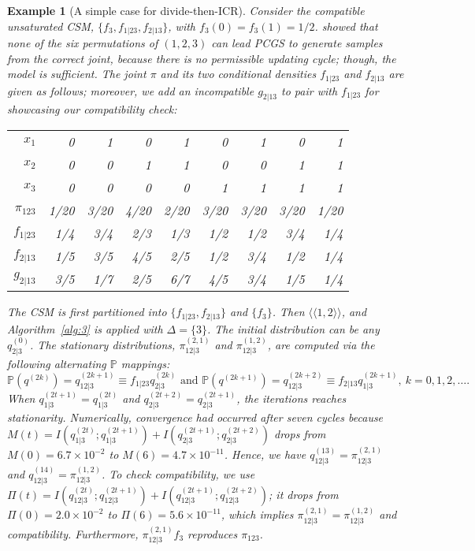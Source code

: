 \documentclass[12pt,a4paper]{article}
\newtheorem{example}{Example}
\begin{document}
\begin{example}[A simple case for divide-then-ICR]\label{ex:1}\rm
Consider the compatible unsaturated CSM, $\{f_3, f_{1|23}, f_{2|13}\}$, with $f_3(0)=f_3(1)=1/2$. \citet{Kuo2018} showed that none of the  six permutations of $(1,2,3)$ can lead PCGS to  generate samples from the correct joint,  because
there is no permissible updating cycle; though, the model is sufficient.
The joint $\pi$ and its two conditional densities $f_{1|23}$ and $f_{2|13}$ are given as follows; moreover, we add an incompatible $g_{2|13}$ to pair with $f_{1|23}$ for showcasing our compatibility check:
\begin{center}
\begin{tabular}{rrrrrrrrr}
\toprule
$x_1$&0&1&0&1&0&1&0&1\\
$x_2$&0&0&1&1&0&0&1&1\\
$x_3$&0&0&0&0&1&1&1&1\\
\midrule
$\pi_{123}$&1/20&3/20&4/20&2/20&3/20&3/20&3/20&1/20\\
$f_{1|23}$&1/4&3/4&2/3&1/3&1/2&1/2&3/4&1/4\\
$f_{2|13}$&1/5&3/5&4/5&2/5&1/2&3/4&1/2&1/4\\
$g_{2|13}$&3/5&1/7&2/5&6/7&4/5&3/4&1/5&1/4\\
\bottomrule
\end{tabular}
\end{center}

The CSM is first partitioned into  $\{f_{1|23}, f_{2|13}\}$  and $\{f_3\}$. Then $\langle \langle 1,2\rangle \rangle$, and
Algorithm~\ref{alg:3} is applied with $\Delta =\{3\}$.  The initial distribution can be any $q^{(0)}_{2|3}$.  The stationary distributions, $\pi_{12|3}^{(2,1)}$  and $\pi_{12|3}^{(1,2)}$, are computed via the following alternating ${\mathbb P}$ mappings:
\[
{\mathbb P}(q^{(2k)})= q^{(2k+1)}_{12|3}\equiv f_{1|23} q^{(2k)}_{2|3} \mbox{ and }
{\mathbb P}(q^{(2k+1)})=q^{(2k+2)}_{12|3} \equiv f_{2|13} q^{(2k+1)}_{1|3},\ k=0,1,2,\ldots.\]
When $q^{(2t+1)}_{1|3}=q^{(2t)}_{1|3}$  and $q^{(2t+2)}_{2|3}=q^{(2t+1)}_{2|3}$, the iterations reaches stationarity.
Numerically, convergence had occurred after seven cycles because $M(t)=I(q^{(2t)}_{1|3};q^{(2t+1)}_{1|3})+I(q^{(2t+1)}_{2|3};q^{(2t+2)}_{2|3})$ drops from $M(0)= 6.7\times 10^{-2}$ to $M(6)=4.7\times 10^{-11}$.  Hence, we have $q^{(13)}_{12|3} = \pi_{12|3}^{(2,1)}$ and $q^{(14)}_{12|3} =\pi_{12|3}^{(1,2)}$.  To check compatibility, we use $\Pi(t)=I(q^{(2t)}_{12|3};q^{(2t+1)}_{12|3})+ I(q^{(2t+1)}_{12|3};q^{(2t+2)}_{12|3})$; it  drops from $\Pi(0)=2.0\times 10^{-2}$ to $\Pi(6)=5.6\times 10^{-11}$, which implies $\pi^{(2,1)}_{12|3}=\pi^{(1,2)}_{12|3}$ and compatibility.  Furthermore, $\pi^{(2,1)}_{12|3} f_3$ reproduces  $\pi_{123}$.




\end{example}
\end{document}
